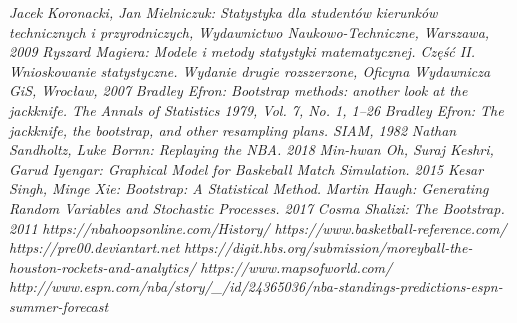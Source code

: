 \documentclass[inzynierska]{pwr_wmat_praca_dyplomowa}
\theoremstyle{plain}
\numberwithin{theorem}{chapter}
\theoremstyle{definition}
\numberwithin{theorem}{chapter}
\begin{document}
\begin{thebibliography}{9}	
	\emph{Jacek Koronacki, Jan Mielniczuk: Statystyka dla studentów kierunków technicznych i przyrodniczych, Wydawnictwo Naukowo-Techniczne, Warszawa, 2009}
	\emph{Ryszard Magiera: Modele i metody statystyki matematycznej. Część II. Wnioskowanie statystyczne. Wydanie drugie rozszerzone, Oficyna Wydawnicza GiS, Wrocław, 2007}
	\emph{Bradley Efron: Bootstrap methods: another look at the jackknife. The Annals of Statistics 1979, Vol. 7, No. 1, 1--26 }
	\emph{Bradley Efron: The jackknife, the bootstrap, and other resampling plans. SIAM, 1982 }
	\emph{Nathan Sandholtz, Luke Bornn: Replaying the NBA. 2018 }
	\emph{Min-hwan Oh, Suraj Keshri, Garud Iyengar: Graphical Model for Baskeball Match Simulation. 2015 }
	\emph{Kesar Singh, Minge Xie: Bootstrap: A Statistical Method. }
	\emph{Martin Haugh: Generating Random Variables and Stochastic Processes. 2017 }
	\emph{Cosma Shalizi: The Bootstrap. 2011 }
	\emph{https://nbahoopsonline.com/History/}
	\emph{https://www.basketball-reference.com/}
	\emph{https://pre00.deviantart.net}
	\emph{https://digit.hbs.org/submission/moreyball-the-houston-rockets-and-analytics/}
	\emph{https://www.mapsofworld.com/}
	\emph{http://www.espn.com/nba/story/\_/id/24365036/nba-standings-predictions-espn-summer-forecast}
		
\end{thebibliography}

\end{document}

